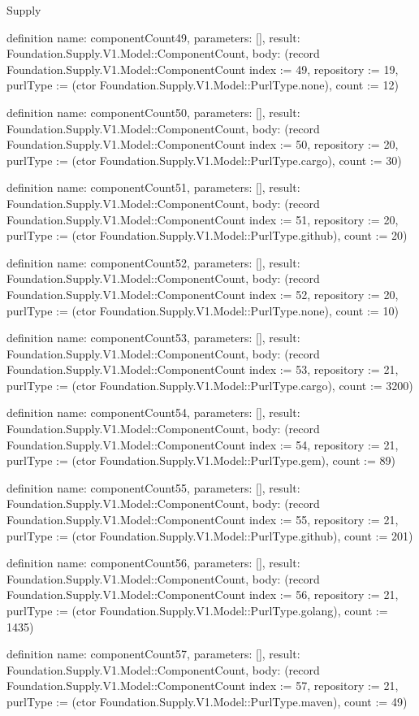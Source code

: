 \begin{lexlean}{Supply}
\begin{semanticmodule}
definition{
  name: componentCount49,
  parameters: [],
  result: Foundation.Supply.V1.Model::ComponentCount,
  body: (record Foundation.Supply.V1.Model::ComponentCount {index := 49, repository := 19, purlType := (ctor Foundation.Supply.V1.Model::PurlType.none), count := 12})
}

definition{
  name: componentCount50,
  parameters: [],
  result: Foundation.Supply.V1.Model::ComponentCount,
  body: (record Foundation.Supply.V1.Model::ComponentCount {index := 50, repository := 20, purlType := (ctor Foundation.Supply.V1.Model::PurlType.cargo), count := 30})
}

definition{
  name: componentCount51,
  parameters: [],
  result: Foundation.Supply.V1.Model::ComponentCount,
  body: (record Foundation.Supply.V1.Model::ComponentCount {index := 51, repository := 20, purlType := (ctor Foundation.Supply.V1.Model::PurlType.github), count := 20})
}

definition{
  name: componentCount52,
  parameters: [],
  result: Foundation.Supply.V1.Model::ComponentCount,
  body: (record Foundation.Supply.V1.Model::ComponentCount {index := 52, repository := 20, purlType := (ctor Foundation.Supply.V1.Model::PurlType.none), count := 10})
}

definition{
  name: componentCount53,
  parameters: [],
  result: Foundation.Supply.V1.Model::ComponentCount,
  body: (record Foundation.Supply.V1.Model::ComponentCount {index := 53, repository := 21, purlType := (ctor Foundation.Supply.V1.Model::PurlType.cargo), count := 3200})
}

definition{
  name: componentCount54,
  parameters: [],
  result: Foundation.Supply.V1.Model::ComponentCount,
  body: (record Foundation.Supply.V1.Model::ComponentCount {index := 54, repository := 21, purlType := (ctor Foundation.Supply.V1.Model::PurlType.gem), count := 89})
}

definition{
  name: componentCount55,
  parameters: [],
  result: Foundation.Supply.V1.Model::ComponentCount,
  body: (record Foundation.Supply.V1.Model::ComponentCount {index := 55, repository := 21, purlType := (ctor Foundation.Supply.V1.Model::PurlType.github), count := 201})
}

definition{
  name: componentCount56,
  parameters: [],
  result: Foundation.Supply.V1.Model::ComponentCount,
  body: (record Foundation.Supply.V1.Model::ComponentCount {index := 56, repository := 21, purlType := (ctor Foundation.Supply.V1.Model::PurlType.golang), count := 1435})
}

definition{
  name: componentCount57,
  parameters: [],
  result: Foundation.Supply.V1.Model::ComponentCount,
  body: (record Foundation.Supply.V1.Model::ComponentCount {index := 57, repository := 21, purlType := (ctor Foundation.Supply.V1.Model::PurlType.maven), count := 49})
}


\end{semanticmodule}
\end{lexlean}
